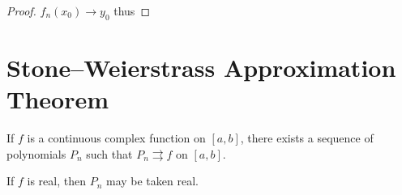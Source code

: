 \begin{proof}
$f_n(x_0)\to y_0$ thus
\end{proof}

\section{Stone--Weierstrass Approximation Theorem}
\begin{theorem}
If $f$ is a continuous complex function on $[a,b]$, there exists a sequence of polynomials $P_n$ such that $P_n\rightrightarrows f$ on $[a,b]$.

If $f$ is real, then $P_n$ may be taken real.
\end{theorem}